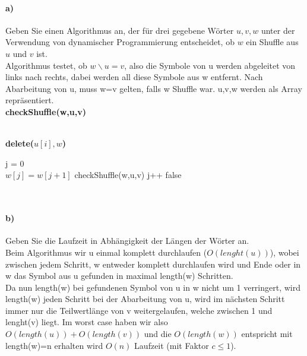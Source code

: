 \documentclass[paper=a4, fontsize=11pt]{scrartcl}
\numberwithin{equation}{section}
\numberwithin{figure}{section}
\numberwithin{table}{section}
\begin{document}
\paragraph{a)}
Geben Sie einen Algorithmus an, der für drei gegebene Wörter $u,v,w$ unter der Verwendung von dynamischer Programmierung entscheidet, ob $w$ ein Shuffle aus $u$ und $v$ ist. \\

Algorithmus testet, ob $w \backslash u = v$, also die Symbole von u werden abgeleitet von links nach rechts, dabei werden all diese Symbole aus w entfernt. Nach Abarbeitung von u, muss w=v gelten, falls w Shuffle war. u,v,w werden als Array repräsentiert. \\

\textbf{checkShuffle(w,u,v)} \\
\begin{algorithm}[H]
\SetAlgoLined
{}
\end{algorithm} \\

\textbf{delete($u[i],w$)} \\
\begin{algorithm}[H]
\SetAlgoLined
j = 0 \\
 {
   {
     {
      $w[j]=w[j+1]$ \;
    }
    \Return checkShuffle(w,u,v)
  }
  j++
  \Return false \;
}
\end{algorithm} \\

\paragraph{b)} 
Geben Sie die Laufzeit in Abhängigkeit der Längen der Wörter an. \\

Beim Algorithmus wir u einmal komplett durchlaufen ($O(lenght(u))$), wobei zwischen jedem Schritt, w entweder komplett durchlaufen wird und Ende oder in w das Symbol aus u gefunden in maximal length(w) Schritten. \\
Da nun length(w) bei gefundenen Symbol von u in w nicht um 1 verringert, wird length(w) jeden Schritt bei der Abarbeitung von u, wird im nächsten Schritt immer nur die Teilwertlänge von v weitergelaufen, welche zwischen 1 und lenght(v) liegt. Im worst case haben wir also $O(length(u))+O(length(v))$ und die $O(length(w))$ entspricht mit length(w)=n erhalten wird $O(n)$ Laufzeit (mit Faktor $c \leq 1$). 
\end{document}
